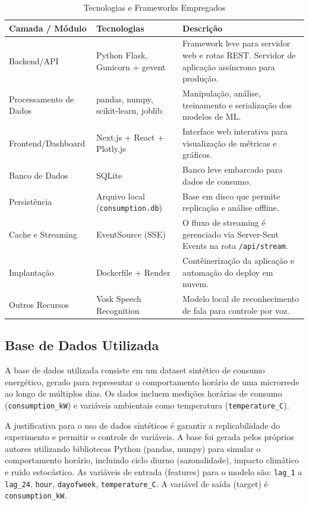 \documentclass[conference]{IEEEtran}
\begin{document}
\begin{table}[htbp]
\caption{Tecnologias e Frameworks Empregados}
\label{tab:tecnologias}
\centering
\renewcommand{\arraystretch}{1.3}
\begin{tabularx}{\columnwidth}{>{\raggedright\arraybackslash}p{2cm} >{\raggedright\arraybackslash}p{2.5cm} X}
\toprule
\textbf{Camada / Módulo} & \textbf{Tecnologias} & \textbf{Descrição} \\
\midrule
Backend/API & Python Flask, Gunicorn + gevent & Framework leve para servidor web e rotas REST. Servidor de aplicação assíncrono para produção. \\
\midrule
Processamento de Dados & pandas, numpy, scikit-learn, joblib & Manipulação, análise, treinamento e serialização dos modelos de ML. \\
\midrule
Frontend/Dashboard & Next.js + React + Plotly.js & Interface web interativa para visualização de métricas e gráficos. \\
\midrule
Banco de Dados & SQLite & Banco leve embarcado para dados de consumo. \\
\midrule
Persistência & Arquivo local (\texttt{consumption.db}) & Base em disco que permite replicação e análise offline. \\
\midrule
Cache e Streaming & EventSource (SSE) & O fluxo de streaming é gerenciado via Server-Sent Events na rota \texttt{/api/stream}. \\
\midrule
Implantação & Dockerfile + Render & Contêinerização da aplicação e automação do deploy em nuvem. \\
\midrule
Outros Recursos & Vosk Speech Recognition & Modelo local de reconhecimento de fala para controle por voz. \\
\bottomrule
\end{tabularx}
\end{table}

\subsection{Base de Dados Utilizada}
A base de dados utilizada consiste em um dataset sintético de consumo energético, gerado para representar o comportamento horário de uma microrrede ao longo de múltiplos dias. Os dados incluem medições horárias de consumo (\texttt{consumption\_kW}) e variáveis ambientais como temperatura (\texttt{temperature\_C}).

A justificativa para o uso de dados sintéticos é garantir a replicabilidade do experimento e permitir o controle de variáveis. A base foi gerada pelos próprios autores utilizando bibliotecas Python (pandas, numpy) para simular o comportamento horário, incluindo ciclo diurno (sazonalidade), impacto climático e ruído estocástico. As variáveis de entrada (features) para o modelo são: \texttt{lag\_1} a \texttt{lag\_24}, \texttt{hour}, \texttt{dayofweek}, \texttt{temperature\_C}. A variável de saída (target) é \texttt{consumption\_kW}.
\end{document}
